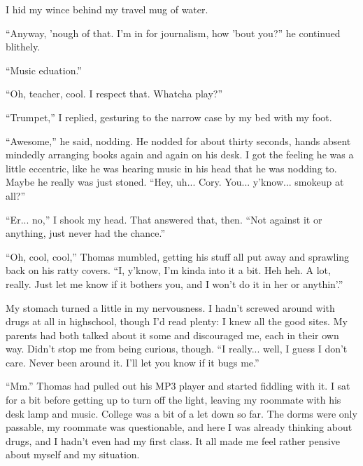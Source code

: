 I hid my wince behind my travel mug of water.

``Anyway, 'nough of that.  I'm in for journalism, how 'bout you?'' he continued blithely.

``Music eduation.''

``Oh, teacher, cool.  I respect that.  Whatcha play?''

``Trumpet,'' I replied, gesturing to the narrow case by my bed with my foot.

``Awesome,'' he said, nodding.  He nodded for about thirty seconds, hands absent mindedly arranging books again and again on his desk.  I got the feeling he was a little eccentric, like he was hearing music in his head that he was nodding to.  Maybe he really was just stoned.  ``Hey, uh... Cory.  You... y'know... smokeup at all?''

``Er... no,'' I shook my head.  That answered that, then.  ``Not against it or anything, just never had the chance.''

``Oh, cool, cool,'' Thomas mumbled, getting his stuff all put away and sprawling back on his ratty covers.  ``I, y'know, I'm kinda into it a bit.  Heh heh.  A lot, really.  Just let me know if it bothers you, and I won't do it in her or anythin'.''

My stomach turned a little in my nervousness.  I hadn't screwed around with drugs at all in highschool, though I'd read plenty: I knew all the good sites.  My parents had both talked about it some and discouraged me, each in their own way.  Didn't stop me from being curious, though.  ``I really... well, I guess I don't care.  Never been around it.   I'll let you know if it bugs me.''

``Mm.''  Thomas had pulled out his MP3 player and started fiddling with it.  I sat for a bit before getting up to turn off the light, leaving my roommate with his desk lamp and music.  College was a bit of a let down so far.  The dorms were only passable, my roommate was questionable, and here I was already thinking about drugs, and I hadn't even had my first class.  It all made me feel rather pensive about myself and my situation.
